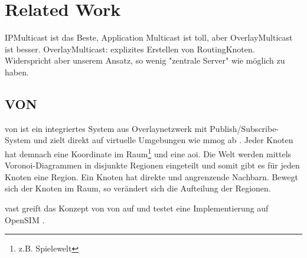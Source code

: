 \chapter{Related Work}
\label{chap:related}

IPMulticast ist das Beste, Application Multicast ist toll, aber OverlayMulticast ist besser. OverlayMulticast: explizites Erstellen von RoutingKnoten. Widerspricht aber unserem Ansatz, so wenig "zentrale Server" wie möglich zu haben.\cite{Lao2005Comparative}









\section{VON}
\label{chap:related:von}
\ac{von} ist ein integriertes System aus Overlaynetzwerk mit Publish/Subscribe-System und zielt direkt auf virtuelle Umgebungen wie \ac{mmog} ab \cite{Hu2006VON}. Jeder Knoten hat demnach eine Koordinate im Raum\footnote{z.B. Spielewelt} und eine \ac{aoi}. Die Welt werden mittels Voronoi-Diagrammen in disjunkte Regionen eingeteilt und somit gibt es für jeden Knoten eine Region. Ein Knoten hat direkte und angrenzende Nachbarn. Bewegt sich der Knoten im Raum, so verändert sich die Aufteilung der Regionen.

\ac{vast} \cite{Backhaus2007Voronoibased} greift das Konzept von \ac{von} auf und testet eine Implementierung auf OpenSIM \cite{Baumgart2007OverSim}.

